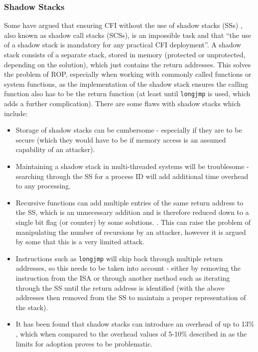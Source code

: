 \subsubsection*{Shadow Stacks}
Some have argued that ensuring CFI without the use of shadow stacks (SSs) \cite{Christoulakis2016}, also known as shadow call stacks (SCSs), is an impossible task and that ``the use of a shadow stack is mandatory for any practical CFI deployment''. A shadow stack consists of a separate stack, stored in memory (protected or unprotected, depending on the solution), which just contains the return addresses. This solves the problem of ROP, especially when working with commonly called functions or system functions, as the implementation of the shadow stack ensures the calling function also has to be the return function (at least until \verb|longjmp| is used, which adds a further complication). There are some flaws with shadow stacks which include:
\begin{itemize}
	\item Storage of shadow stacks can be cumbersome - especially if they are to be secure (which they would have to be if memory access is an assumed capability of an attacker).
	\item Maintaining a shadow stack in multi-threaded systems will be troublesome - searching through the SS for a process ID will add additional time overhead to any processing.
	\item Recursive functions can add multiple entries of the same return address to the SS, which is an unnecessary addition and is therefore reduced down to a single bit flag (or counter) by some solutions. \cite{Christoulakis2016}. This can raise the problem of manipulating the number of recursions by an attacker, however it is argued by some that this is a very limited attack.
	\item Instructions such as \verb|longjmp| will skip back through multiple return addresses, so this needs to be taken into account - either by removing the instruction from the ISA or through another method such as iterating through the SS until the return address is identified (with the above addresses then removed from the SS to maintain a proper representation of the stack).
	\item It has been found that shadow stacks can introduce an overhead of up to 13\% \cite{Dang}, which when compared to the overhead values of 5-10\% described in \cite{Szekeres2013} as the limits for adoption proves to be problematic.
\end{itemize}

